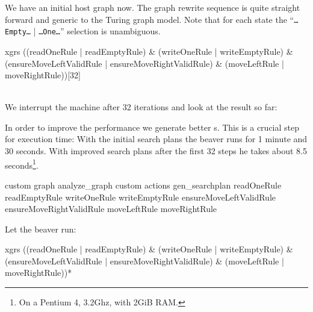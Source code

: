 We have an initial host graph now. The graph rewrite sequence is quite straight forward and generic to the Turing graph model. Note that for each state the ``\texttt{\dots Empty\dots} | \texttt{\dots One\dots}'' selection is unambiguous.
\begin{grshell}[firstnumber=last]
  xgrs ((readOneRule | readEmptyRule) & (writeOneRule | writeEmptyRule) & (ensureMoveLeftValidRule | ensureMoveRightValidRule) & (moveLeftRule | moveRightRule))[32]

\end{grshell}
\quad\\We interrupt the machine after 32 iterations and look at the result so far:
\begin{center}
\end{center}
In order to improve the performance we generate better s. This is a crucial step for execution time: With the initial search plans the beaver runs for 1 minute and 30 seconds. With improved search plans after the first 32 steps he takes about 8.5 seconds\footnote{On a Pentium 4, 3.2Ghz, with 2GiB RAM.}.
\begin{grshell}[firstnumber=last]
custom graph analyze_graph
custom actions gen_searchplan readOneRule readEmptyRule writeOneRule writeEmptyRule ensureMoveLeftValidRule ensureMoveRightValidRule moveLeftRule moveRightRule

\end{grshell}

Let the beaver run:
\begin{grshell}[firstnumber=last]
  xgrs ((readOneRule | readEmptyRule) & (writeOneRule | writeEmptyRule) & (ensureMoveLeftValidRule | ensureMoveRightValidRule) & (moveLeftRule | moveRightRule))*
\end{grshell}


